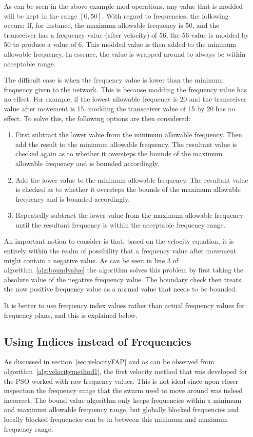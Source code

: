 As can be seen in the above example mod operations, any value that is modded will be kept in the range $[0,50]$. With regard to frequencies, the following occurs: If, for instance, the maximum allowable frequency is 50, and the transceiver has a frequency value (after velocity) of 56, the 56 value is modded by 50 to produce a value of 6. This modded value is then added to the minimum allowable frequency. In essence, the value is wrapped around to always be within acceptable range. 

The difficult case is when the frequency value is lower than the minimum frequency given to the network. This is because modding the frequency value has no effect. For example, if the lowest allowable frequency is 20 and the transceiver value after movement is 15, modding the transceiver value of 15 by 20 has no effect. To solve this, the following options are then considered:

\begin{enumerate}
\item First subtract the lower value from the minimum allowable frequency. Then add the result to the minimum allowable frequency. The resultant value is checked again as to whether it oversteps the bounds of the maximum allowable frequency and is bounded accordingly.
\item Add the lower value to the minimum allowable frequency. The resultant value is checked as to whether it oversteps the bounds of the maximum allowable frequency and is bounded accordingly.
\item Repeatedly subtract the lower value from the maximum allowable frequency until the resultant frequency is within the acceptable frequency range.
\end{enumerate}

An important notion to consider is that, based on the velocity equation, it is entirely within the realm of possibility that a frequency value after movement might contain a negative value. As can be seen in line 3 of algorithm~\ref{alg:boundvalue} the algorithm solves this problem by first taking the absolute value of the negative frequency value. The boundary check then treats the now positive frequency value as a normal value that needs to be bounded.

It is better to use frequency index values rather than actual frequency values for frequency plans, and this is explained below.
\subsection{Using Indices instead of Frequencies}
\label{sec:velocityFAP2}
As discussed in section~\ref{sec:velocityFAP} and as can be observed from algorithm~\ref{alg:velocitymethod1}, the first velocity method that was developed for the \gls{PSO} worked with raw frequency values. This is not ideal since upon closer inspection the frequency range that the swarm used to move around was indeed incorrect. The bound value algorithm only keeps frequencies within a minimum and maximum allowable frequency range, but globally blocked frequencies and locally blocked frequencies can be in between this minimum and maximum frequency range. 

